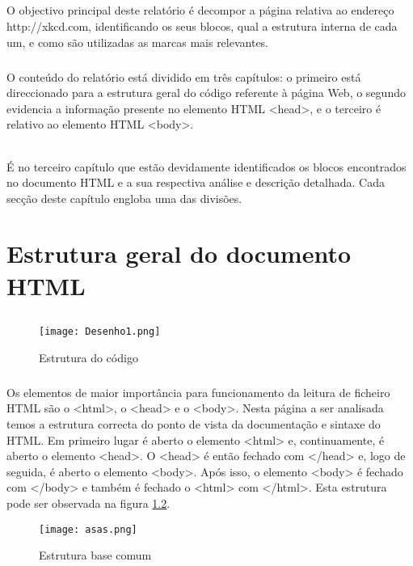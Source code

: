\documentclass[a4paper,12pt,openright,oneside]{report}
\begin{document}
\paragraph*{}
O objectivo principal deste relatório é decompor a página relativa ao endereço http://xkcd.com, identificando os seus blocos, qual a estrutura interna de cada um, e como são utilizadas as marcas mais relevantes.
\paragraph*{}
O conteúdo do relatório está dividido em três capítulos: o primeiro está direccionado para a estrutura geral do código referente à página Web, o segundo evidencia a informação presente no elemento HTML <head>, e o terceiro é relativo ao elemento HTML <body>.
\subparagraph*{}
É no terceiro capítulo que estão devidamente identificados os blocos encontrados no documento HTML e a sua respectiva análise e descrição detalhada. Cada secção deste capítulo engloba uma das divisões.


\chapter{Estrutura geral do documento HTML}
\section*{}
\begin{figure}[h!]
\center
\texttt{[image: Desenho1.png]}
\caption{Estrutura do código}
\label{Desenho1}
\end{figure}

\paragraph{}
Os elementos de maior importância para funcionamento da leitura de ficheiro HTML são o <html>, o <head> e o <body>.
Nesta página a ser analisada temos a estrutura correcta do ponto de vista da documentação e sintaxe do HTML. Em primeiro lugar é aberto o elemento <html> e,  continuamente, é aberto o elemento <head>. O <head> é então fechado com </head> e, logo de seguida, é aberto o elemento <body>. Após isso, o elemento <body> é fechado com </body> e também é fechado o <html> com </html>. Esta estrutura pode ser observada na figura \ref{asas}. \cite{b}

\begin{figure}[h!]
\center
\texttt{[image: asas.png]}
\caption{Estrutura base comum}
\label{asas}
\end{figure}
\end{document}
